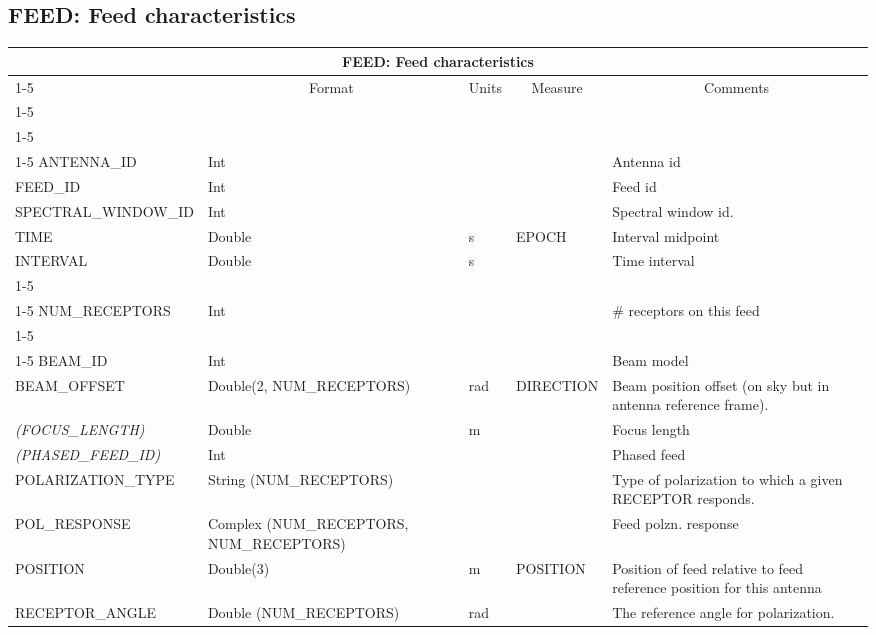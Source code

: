 \documentclass{article}
\newcommand{\defline}[1]{\cline{1-5}
\multicolumn{5}{|l|}{#1} \\
\cline{1-5}}
\newcommand{\definetable}[2]
{
	\vfill\newpage
	\subsection{#1}
        \vspace{0.15in}
        \small
	\begin{tabular}{|l|p{1.25in}|l|p{.9in}|p{1.4in}|}
	\hline
	\multicolumn{5}{|c|}{\bf #1}\\ 
	\cline{1-5}
        \multicolumn{1}{|c|}{Name}&\multicolumn{1}{|c|}{Format}&
        \multicolumn{1}{|c|}{Units}&\multicolumn{1}{|c|}{Measure}&
        \multicolumn{1}{|c|}{Comments}\\
        \cline{1-5}
        #2
        \hline
	\end{tabular}
}
\begin{document}
\definetable{FEED: Feed characteristics}{
\defline{\bf Columns}
\defline{\em Key}
ANTENNA\_ID &     Int &    &      & Antenna id\\
FEED\_ID &        Int &    &      & Feed id\\
SPECTRAL\_WINDOW\_ID &   Int &    &      & Spectral window id.\\
TIME &   Double  &      s  & EPOCH & Interval midpoint \\
INTERVAL &       Double  &      s     &       & Time interval\\
\defline{\em Data description}
NUM\_RECEPTORS &  Int &    &      & \# receptors on this feed \\
\defline{\em Data}
BEAM\_ID &        Int    &    &      & Beam model\\
BEAM\_OFFSET &    Double(2, NUM\_RECEPTORS)    &     rad & DIRECTION & Beam position offset (on sky but in antenna reference frame).\\
{\it (FOCUS\_LENGTH)} &   Double &    m       &       & Focus length \\
{\it (PHASED\_FEED\_ID)} & Int   &    &      & Phased feed\\
POLARIZATION\_TYPE &       String (NUM\_RECEPTORS) &    &      & Type of polarization to which a given RECEPTOR responds.\\
POL\_RESPONSE &  Complex (NUM\_RECEPTORS, NUM\_RECEPTORS) &    &      & Feed polzn. response\\
POSITION &    Double(3)  & m  &         POSITION & Position of feed relative to feed reference position for this antenna\\
RECEPTOR\_ANGLE &    Double (NUM\_RECEPTORS) &    rad &    & The reference angle for polarization.\\
}
\end{document}
